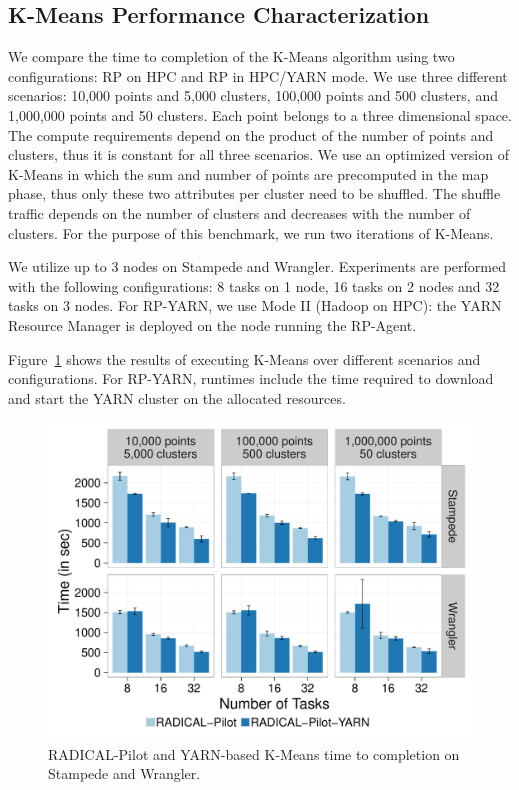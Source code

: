 \subsection{K-Means Performance Characterization}
\label{ssec:kmeans}

We compare the time to completion of the K-Means algorithm using two
configurations: RP on HPC and RP in HPC/YARN mode. We use
three different scenarios: 10,000 points and 5,000 clusters, 100,000 points and
500 clusters, and 1,000,000 points and 50 clusters. Each point belongs to a
three dimensional space. The compute requirements depend on the product of the
number of points and clusters, thus it is constant for all three scenarios. We
use an optimized version of K-Means in which the sum and number of points are
precomputed in the map phase, thus only these two attributes per cluster need to
be shuffled. The shuffle traffic depends on the number of clusters and decreases
with the number of clusters. For the purpose of this benchmark, we run two
iterations of K-Means.

We utilize up to 3 nodes on Stampede and Wrangler. Experiments are performed
with the following configurations: 8 tasks on 1 node, 16 tasks on 2 nodes and 32
tasks on 3 nodes. For RP-YARN, we use Mode II (Hadoop on HPC): the
YARN Resource Manager is deployed on the node running the RP-Agent.

Figure~\ref{fig:experiments_kmeans_rpyarnkmeans} shows the results of executing
K-Means over different scenarios and configurations. For RP-YARN,
runtimes include the time required to download and start the YARN cluster on the
allocated resources.

\begin{figure}[t]
    \centering
    \includegraphics[width=.75\textwidth]{figures/data_analytics_hpc/hpc_hadoop/kmeans.pdf}
    \caption{RADICAL-Pilot and YARN-based K-Means time to completion on Stampede and Wrangler.}
    \label{fig:experiments_kmeans_rpyarnkmeans}
\end{figure}

